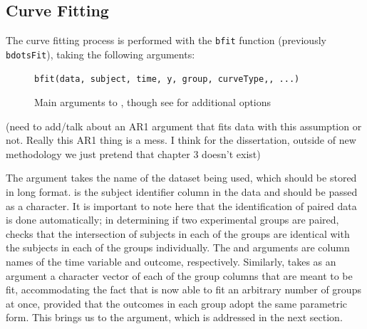 \subsection{Curve Fitting}

The curve fitting process is performed with the \texttt{bfit} function (previously \texttt{bdotsFit}), taking the following arguments:


\begin{figure}[h!]
\centering
\begin{BVerbatim}
bfit(data, subject, time, y, group, curveType,, ...)
\end{BVerbatim}
\caption{Main arguments to , though see  for additional options}
\end{figure}


(need to add/talk about an AR1 argument that fits data with this assumption or not. Really this AR1 thing is a mess. I think for the dissertation, outside of new methodology we just pretend that chapter 3 doesn't exist)

The  argument takes the name of the dataset being used, which should be stored in long format.  is the subject identifier column in the data and should be passed as a character. It is important to note here that the identification of paired data is done automatically; in determining if two experimental groups are paired,  checks that the intersection of subjects in each of the groups are identical with the subjects in each of the groups individually. The  and  arguments are column names of the time variable and outcome, respectively. Similarly,  takes as an argument a character vector of each of the group columns that are meant to be fit, accommodating the fact that  is now able to fit an arbitrary number of groups at once, provided that the outcomes in each group adopt the same parametric form. This brings us to the  argument, which is addressed in the next section.


